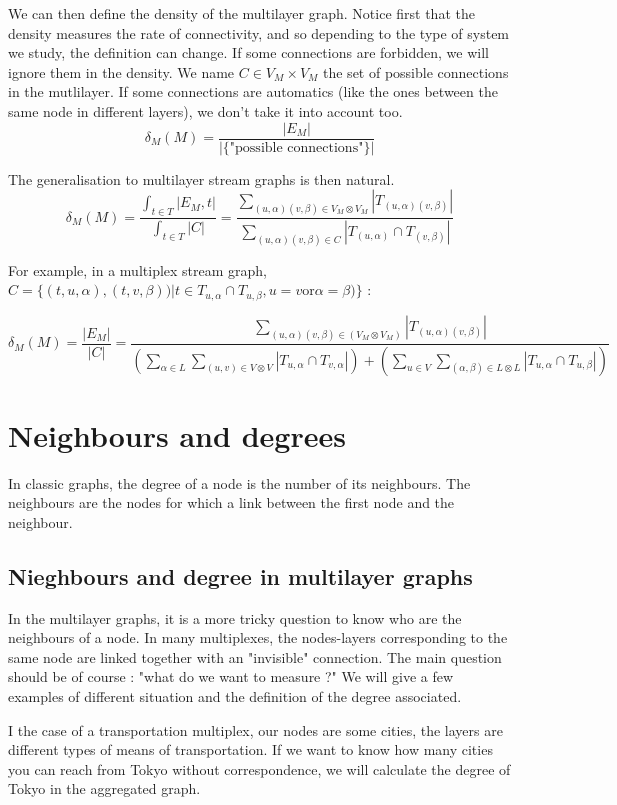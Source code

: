 \documentclass[dvipsnames,a4paper,11pt]{article}
\theoremstyle{definition}
\theoremstyle{remark}
\theoremstyle{remark}
\begin{document}
	We can then define the density of the multilayer graph. Notice first that the density measures the rate of connectivity, and so depending to the type of system we study, the definition can change. If some connections are forbidden, we will ignore them in the density. We name $C \in V_M\times V_M$ the set of possible connections in the mutlilayer. If some connections are automatics (like the ones between the same node in different layers), we don't take it into account too.
	\[
		\delta_M (M) = \frac{|E_M|}{|\{\text{"possible connections"}\}|}
	\]

	The generalisation to multilayer stream graphs is then natural.
	\[
		\delta_M (M) = \frac{\int_{t\in T}|E_M,t|}{\int_{t\in T}|C|} = \frac{\sum_{(u,\alpha)(v,\beta) \in V_M \otimes V_M}|T_{(u,\alpha)(v,\beta)}|}{\sum_{(u,\alpha)(v,\beta) \in C}|T_{(u,\alpha)}\cap T_{(v,\beta)}|}
	\]

	For example, in a multiplex stream graph, $C=\{(t,u,\alpha),(t,v,\beta))| t\in T_{u,\alpha} \cap T_{u,\beta}, u=v \text{or} \alpha = \beta)\}$ :

	\[
		\delta_M (M) = 
		\frac{|E_M|}{|C|}= 
		\frac{\sum_{(u,\alpha)(v,\beta) \in (V_M \otimes V_M)} |T_{(u,\alpha)(v,\beta)}|}
		{(\sum_{\alpha \in L}\sum_{(u,v) \in V\otimes V}|T_{u,\alpha} \cap T_{v,\alpha}|)+( \sum_{u \in V } \sum_{(\alpha,\beta) \in L \otimes L}|T_{u,\alpha}\cap T_{u,\beta}|)}
	\]

		\section{Neighbours and degrees}
	
		In classic graphs, the degree of a node is the number of its neighbours. The neighbours are the nodes for which a link between the first node and the neighbour.
		
		\subsection{Nieghbours and degree in multilayer graphs}
		
		In the multilayer graphs, it is a more tricky question to know who are the neighbours of a node. In many multiplexes, the nodes-layers corresponding to the same node are linked together with an "invisible" connection. The main question should be of course : "what do we want to measure ?" We will give a few examples of different situation and the definition of the degree associated.
		
		I the case of a transportation multiplex, our nodes are some cities, the layers are different types of means of transportation. If we want to know how many cities you can reach from Tokyo without correspondence, we will calculate the degree of Tokyo in the aggregated graph.
		
\end{document}

